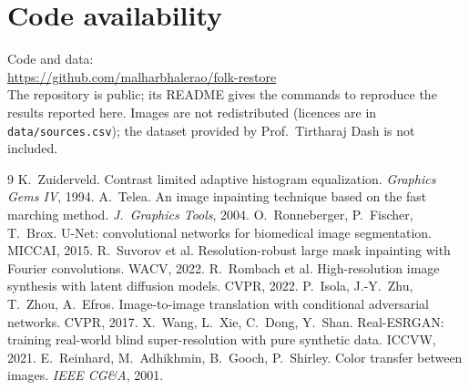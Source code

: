 \documentclass[11pt,a4paper,twocolumn]{article}
\newcommand{\githuburl}{https://github.com/malharbhalerao/folk-restore}
\begin{document}
\section*{Code availability}
\noindent Code and data:\\
\url{\githuburl}\\
The repository is public; its README gives the commands to reproduce the results reported here. Images are not redistributed (licences are in \texttt{data/sources.csv}); the dataset provided by Prof.\ Tirtharaj Dash is not included.

\begin{thebibliography}{9}
\small
{} K.~Zuiderveld. Contrast limited adaptive histogram equalization. \emph{Graphics Gems IV}, 1994.
 A.~Telea. An image inpainting technique based on the fast marching method. \emph{J.\ Graphics Tools}, 2004.
 O.~Ronneberger, P.~Fischer, T.~Brox. U-Net: convolutional networks for biomedical image segmentation. MICCAI, 2015.
 R.~Suvorov et al. Resolution-robust large mask inpainting with Fourier convolutions. WACV, 2022.
 R.~Rombach et al. High-resolution image synthesis with latent diffusion models. CVPR, 2022.
 P.~Isola, J.-Y.~Zhu, T.~Zhou, A.~Efros. Image-to-image translation with conditional adversarial networks. CVPR, 2017.
 X.~Wang, L.~Xie, C.~Dong, Y.~Shan. Real-ESRGAN: training real-world blind super-resolution with pure synthetic data. ICCVW, 2021.
 E.~Reinhard, M.~Adhikhmin, B.~Gooch, P.~Shirley. Color transfer between images. \emph{IEEE CG\&A}, 2001.
\end{thebibliography}
\end{document}
